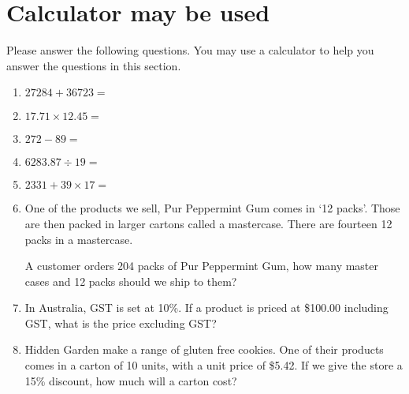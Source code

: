 \documentclass[a4paper]{article}
\begin{document}
\section{Calculator may be used}
Please answer the following questions. You may use a calculator to help you answer the questions in this section.
\begin{enumerate}\addtolength{\itemsep}{3\baselineskip}

\item \begin{math} 27284 + 36723 = \end{math} 
\item \begin{math} 17.71 \times 12.45 = \end{math} 
\item \begin{math} 272 - 89 = \end{math} 
\item \begin{math} 6283.87 \div 19 = \end{math} 
\item \begin{math} 2331 + 39 \times 17 = \end{math} 
\item One of the products we sell, Pur Peppermint Gum comes in `12 packs'. Those are then packed in larger cartons called a mastercase.
  There are fourteen 12 packs in a mastercase.
  

  A customer orders 204 packs of Pur Peppermint Gum, how many master cases and 12 packs should we ship to them?
  
  
\item In Australia, GST is set at 10\%. If a product is priced at
  \$100.00 including GST, what is the price excluding GST?


\item Hidden Garden make a range of gluten free cookies. One of their products comes in a carton of 10 units, with a unit price of \$5.42.
  If we give the store a 15\% discount, how much will a carton cost?

  

\end{enumerate}
\end{document}
